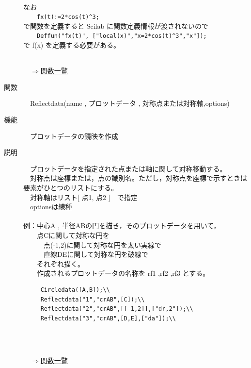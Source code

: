 \documentclass[papersize,a4paper,12pt,uplatex]{jsarticle}
\begin{document}
\begin{description}
　　　　　　　　

なお\\
　　\verb|fx(t):=2*cos(t)^3;|\\
で関数を定義すると Scilab に関数定義情報が渡されないので\\
　　\verb|Deffun("fx(t)", ["local(x)","x=2*cos(t)^3","x"]);|\\
で f(x) を定義する必要がある。
　\\
　\\
\begin{flushright}　\hyperlink{functionlist}{$\Rightarrow$関数一覧}\end{flushright}

\hypertarget{reflextdata}{}
\item[関数]　Reflectdata(name , プロットデータ , 対称点または対称軸,options)
\item[機能]　プロットデータの鏡映を作成
\item[説明]　プロットデータを指定された点または軸に関して対称移動する。\\
　対称点は座標または，点の識別名。ただし，対称点を座標で示すときは要素がひとつのリストにする。\\
　対称軸はリスト[ 点1, 点2 ]　で指定\\
　optionsは線種\\
\\
例：中心A , 半径ABの円を描き，そのプロットデータを用いて，\\
　　点Cに関して対称な円を\\
　　　点(-1,2)に関して対称な円を太い実線で\\
　　　直線DEに関して対称な円を破線で\\
　　それぞれ描く。\\
　　作成されるプロットデータの名称を rf1 ,rf2 ,rf3 とする。
\begin{verbatim}
　　　Circledata([A,B]);\\
　　　Reflectdata("1","crAB",[C]);\\
　　　Reflectdata("2","crAB",[[-1,2]],["dr,2"]);\\
　　　Reflectdata("3","crAB",[D,E],["da"]);\\
\end{verbatim}
　\\
　　　

\begin{flushright}　\hyperlink{functionlist}{$\Rightarrow$関数一覧}\end{flushright}


\end{description}
\end{document}
